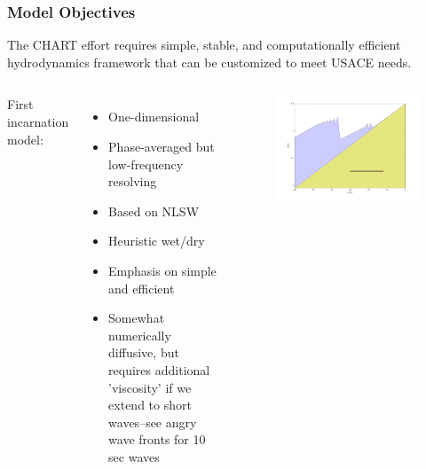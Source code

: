 \documentclass[aspectratio=169]{beamer}
\begin{document}
\begin{frame}
  \frametitle{Model Objectives}

  The CHART effort requires  simple, stable, and computationally efficient hydrodynamics framework that can be customized to meet USACE needs.
 \begin{columns}[c] %
    

  First incarnation model:
 \begin{itemize}
 \item One-dimensional
 \item Phase-averaged but low-frequency resolving
 \item Based on NLSW 
 \item Heuristic wet/dry
 \item Emphasis on simple and efficient
 \item Somewhat numerically diffusive, but requires additional 'viscosity' if we extend to short waves--see angry wave fronts for 10 sec waves
   \end{itemize}
    \begin{figure}
      \includegraphics[width=1\linewidth]{./shortwave.png}
    \end{figure}

 \end{columns}
 \end{frame}
\end{document}
